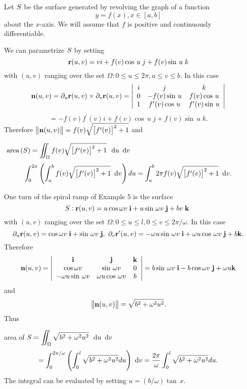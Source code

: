 \begin{exa} Let $S$ be the
surface generated by revolving the graph of a function
\[
y=f(x),x\in [a,b]
\]
about the $x$-axis. We will assume that $f$ is positive and continuously
differentiable.

We can parametrize $S$ by setting
\[
\mathbf{ r}(u,v)=vi+f(v)\cos \,u\;j+f(v)\sin \,u\;k
\]
with $(u,v)$ ranging over the set $\Omega :0\leq u\leq 2\pi ,a\le v\le b.$
In this case
\[
 \mathbf{ n}(u,v)=\partial_u \mathbf{ r}(u,v)\times \partial_v \mathbf{ r}(u,v)=\left|
\begin{array}{ccc}
i & j & k \\
0 & -f(v)\sin \,u & f(v)\cos \,u \\
1 & f^{\prime }(v)\cos \,u & f^{\prime }(v)\sin \,u
\end{array}
\right|
\]
\[
=-f(v)f^{\prime }(v)i+f(v)\cos \,u\;j+f(v)\sin \,u\;k.
\]
Therefore $\left\|\mathbf{ n}(u,v)\right\| =f(v)\sqrt{\left[ f^{\prime }(v)\right]
^2+1}$ and

\begin{center}
$\area{\superficie}=\diint_\Omega f(v)\sqrt{\left[ f^{\prime }(v)\right] ^2+1}\,\du\dv$%
\[
\dint_0^{2\pi }\left( \dint_a^bf(v)\sqrt{\left[ f^{\prime }(v)\right] ^2+1}%
\dv\right) du=\dint_a^b2\pi f(v)\sqrt{\left[ f^{\prime }(v)\right] ^2+1}\dv.
\]
\end{center}

\end{exa}

\begin{exa} One turn of the spiral ramp of Example
5 is the surface
\[
S:\mathbf{ r}(u,v)=u\cos \omega v\;\mathbf{ i}+u\sin \,\omega v\;\mathbf{ j}+bv\;\mathbf{ k}\text{ }
\]
with $(u,v)$ ranging over the set $\Omega :$$0\le u\le l,0\le v\le 2\pi
/\omega .$ In this case
\[
\partial_u \mathbf{ r}(u,v)=\cos \omega v\;\mathbf{ i}+\sin \,\omega v\;\mathbf{ j},\text{ }\partial_v \mathbf{ r}^{\prime
}(u,v)=-\omega u\sin \,\omega v\;\mathbf{ i}+\omega u\cos \,\omega v\;\mathbf{ j}+b\mathbf{ k}.
\]
Therefore
\[
 \mathbf{ n}(u,v)=\left|
\begin{array}{ccc}
\mathbf{ i} & \mathbf{ j} & \mathbf{ k} \\
\cos \omega v & \sin \,\omega v & 0 \\
-\omega u\sin \,\omega v & \omega u\cos \,\omega v & b
\end{array}
\right| =b\sin \,\omega v\;\mathbf{ i}-b\cos \omega v\;\mathbf{ j}+\omega u\mathbf{ k}
\]
and
\[
\left\|  \mathbf{ n}(u,v)\right\| =\sqrt{b^2+\omega ^2u^2}.
\]
Thus

area of $\superficie=\diint_{\Omega }\sqrt{b^{2}+\omega ^{2}u^{2}}\,\du\dv$%
\[
=\dint_{0}^{2\pi /\omega }\left( \dint_{0}^{l}\sqrt{b^{2}+\omega ^{2}u^{2}}%
du\right) \dv=\dfrac{2\pi }{\omega }\dint_{0}^{l}\sqrt{b^{2}+\omega ^{2}u^{2}}%
du.
\]
The integral can be evaluated by setting $u=(b/\omega )\tan \,x.$


\end{exa}
